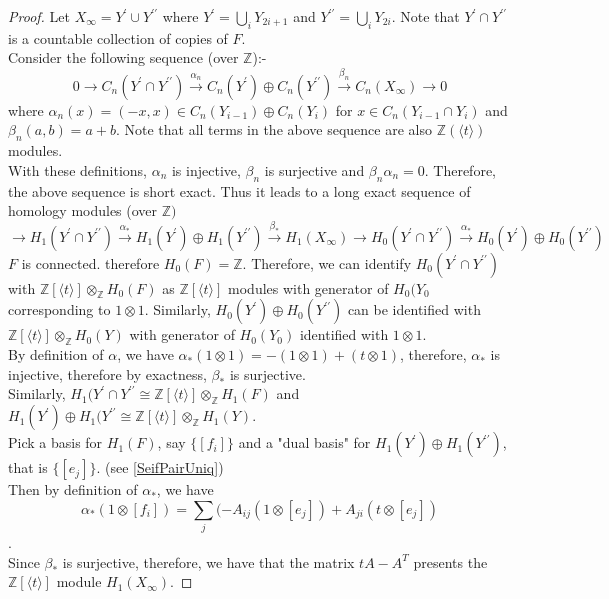 \documentclass{article}[10pt]
\begin{document}
\begin{proof}
Let $X_{\infty}=Y^{\prime} \cup Y^{\prime\prime}$ where $ Y^{\prime}= \bigcup\limits_{i}Y_{2i+1}$ and $Y^{\prime\prime} = \bigcup\limits_{i}Y_{2i}$. Note that $Y^{\prime}\cap Y^{\prime\prime}$ is a countable collection of copies of $F$.\\
Consider the following sequence (over $\mathbb{Z}$):- 
$$0\xrightarrow{}C_{n}(Y^{\prime}\cap Y^{\prime\prime})\xrightarrow{\alpha_{n}}C_{n}(Y^{\prime})\oplus C_{n}(Y^{\prime\prime})\xrightarrow{\beta_{n}}C_{n}(X_{\infty})\xrightarrow{}0$$ where $\alpha_{n}(x)=(-x,x) \in C_{n}(Y_{i-1})\oplus C_n(Y_{i})$ for $x \in C_{n}(Y_{i-1}\cap Y_{i})$ and $\beta_{n}(a,b)=a+b$.
Note that all terms in the above sequence are also $\mathbb{Z}(\langle t\rangle)$ modules.\\
With these definitions, $\alpha_{n}$ is injective, $\beta_{n}$ is surjective and $\beta_{n}\alpha_{n}=0$.
Therefore, the above sequence is short exact. Thus it leads to a long exact sequence of homology modules (over $\mathbb{Z})$
$$\xrightarrow{} H_{1}(Y^{\prime}\cap Y^{\prime\prime}) \xrightarrow{\alpha_{*}} H_{1}(Y^{\prime})\oplus H_{1}(Y^{\prime\prime})\xrightarrow{\beta_{*}}H_{1}(X_{\infty})\xrightarrow{}H_{0}(Y^{\prime}\cap Y^{\prime\prime}) \xrightarrow{\alpha_{*}} H_{0}(Y^{\prime})\oplus H_{0}(Y^{\prime\prime})$$
$F$ is connected. therefore $H_{0}(F) = \mathbb{Z}$. Therefore, we can identify $H_{0}(Y^{\prime}\cap Y^{\prime\prime})$ with $\mathbb{Z}[\langle t \rangle]\otimes_{\mathbb{Z}}H_{0}(F)$ as $\mathbb{Z}[\langle t \rangle]$ modules with generator of $H_{0}(Y_{0}$ corresponding to $1\otimes 1$. Similarly, $H_{0}(Y^{\prime})\oplus H_{0}(Y^{\prime\prime})$ can be identified with $\mathbb{Z}[\langle t \rangle]\otimes_{\mathbb{Z}}H_{0}(Y)$ with generator of $H_{0}(Y_{0})$ identified with $1\otimes 1$.\\
By definition of $\alpha$, we have $\alpha_{*}(1\otimes 1) = -(1\otimes 1) + (t\otimes1)$, therefore, $\alpha_{*}$ is injective, therefore by exactness, $\beta_{*}$ is surjective.\\
Similarly, $H_{1}(Y^{\prime}\cap Y^{\prime\prime} \cong \mathbb{Z}[\langle t \rangle]\otimes_{\mathbb{Z}}H_{1}(F)$ and $H_{1}(Y^{\prime})\oplus H_{1}(Y^{\prime\prime} \cong \mathbb{Z}[\langle t \rangle]\otimes_{\mathbb{Z}}H_{1}(Y)$.\\
Pick a basis for $H_{1}(F)$, say $\{[f_{i}]\}$ and a "dual basis" for $H_{1}(Y^{\prime})\oplus H_{1}(Y^{\prime\prime})$, that is $\{[e_{j}]\}$. (see \ref{SeifPairUniq})\\
Then by definition of $\alpha_{*}$, we have $$
\alpha_{*}(1 \otimes[f_{i}])=\sum_{j}(-A_{ij}(1 \otimes[e_{j}])+A_{ji}(t \otimes[e_{j}])$$.\\
Since $\beta_{*}$ is surjective, therefore, we have that the matrix $tA-A^{T}$ presents the $\mathbb{Z}[\langle t \rangle]$ module $H_{1}(X_{\infty})$.
\end{proof}
\end{document}
